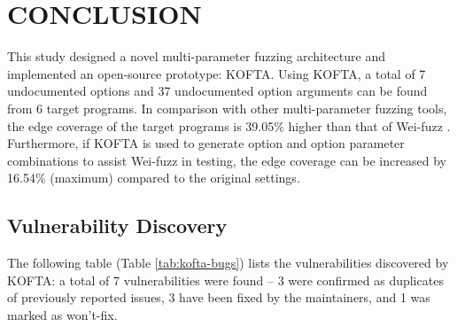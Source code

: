 \section{CONCLUSION}
\label{ch:conclusion}
\iffalse
本研究設計了一種全新的多參數模糊測試架構，並實作了開源的原型：KOFTA。
透過 KOFTA，能夠從 6 個目標程式中找到共7未載明於文件的選項與37個未載明於文件的選項參數。
與其他多參數模糊測試工具的比較中，目標程式的路徑覆蓋率比 Wei-fuzz \cite{tseng2023wei} 高出 39.05\%。並且，如使用 KOFTA 產生選項、選項參數組合以協助 Wei-fuzz 進行測試，更可比原本設定多出 16.54\% (最大)的路徑覆蓋率。
\else
This study designed a novel multi-parameter fuzzing architecture and implemented an open-source prototype: KOFTA.
Using KOFTA, a total of 7 undocumented options and 37 undocumented option arguments can be found from 6 target programs.
In comparison with other multi-parameter fuzzing tools, the edge coverage of the target programs is 39.05\% higher than that of Wei-fuzz \cite{tseng2023wei}. Furthermore, if KOFTA is used to generate option and option parameter combinations to assist Wei-fuzz in testing, the edge coverage can be increased by 16.54\% (maximum) compared to the original settings.
\fi

\subsection{Vulnerability Discovery} %

The following table (Table \ref{tab:kofta-bugs}) lists the vulnerabilities discovered by KOFTA: a total of 7 vulnerabilities were found -- 3 were confirmed as duplicates of previously reported issues, 3 have been fixed by the maintainers, and 1 was marked as won't-fix.

